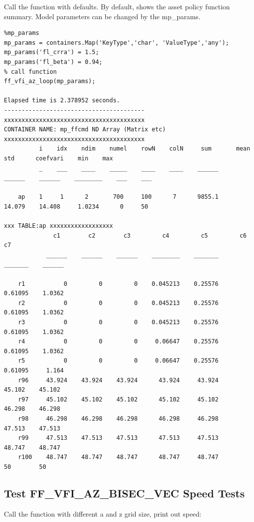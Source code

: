 \documentclass[
]{book}
\begin{document}
Call the function with defaults. By default, shows the asset policy
function summary. Model parameters can be changed by the mp\_params.

\begin{verbatim}
%mp_params
mp_params = containers.Map('KeyType','char', 'ValueType','any');
mp_params('fl_crra') = 1.5;
mp_params('fl_beta') = 0.94;
% call function
ff_vfi_az_loop(mp_params);

Elapsed time is 2.378952 seconds.
----------------------------------------
xxxxxxxxxxxxxxxxxxxxxxxxxxxxxxxxxxxxxxxx
CONTAINER NAME: mp_ffcmd ND Array (Matrix etc)
xxxxxxxxxxxxxxxxxxxxxxxxxxxxxxxxxxxxxxxx
          i    idx    ndim    numel    rowN    colN     sum       mean      std      coefvari    min    max
          _    ___    ____    _____    ____    ____    ______    ______    ______    ________    ___    ___

    ap    1     1      2       700     100      7      9855.1    14.079    14.408     1.0234      0     50 

xxx TABLE:ap xxxxxxxxxxxxxxxxxx
              c1        c2        c3         c4         c5         c6         c7  
            ______    ______    ______    ________    _______    _______    ______

    r1           0         0         0    0.045213    0.25576    0.61095    1.0362
    r2           0         0         0    0.045213    0.25576    0.61095    1.0362
    r3           0         0         0    0.045213    0.25576    0.61095    1.0362
    r4           0         0         0     0.06647    0.25576    0.61095    1.0362
    r5           0         0         0     0.06647    0.25576    0.61095     1.164
    r96     43.924    43.924    43.924      43.924     43.924     45.102    45.102
    r97     45.102    45.102    45.102      45.102     45.102     46.298    46.298
    r98     46.298    46.298    46.298      46.298     46.298     47.513    47.513
    r99     47.513    47.513    47.513      47.513     47.513     48.747    48.747
    r100    48.747    48.747    48.747      48.747     48.747         50        50
\end{verbatim}

\hypertarget{test-ff_vfi_az_bisec_vec-speed-tests}{%
\subsection{Test FF\_VFI\_AZ\_BISEC\_VEC Speed Tests}\label{test-ff_vfi_az_bisec_vec-speed-tests}}

Call the function with different a and z grid size, print out speed:
\end{document}
